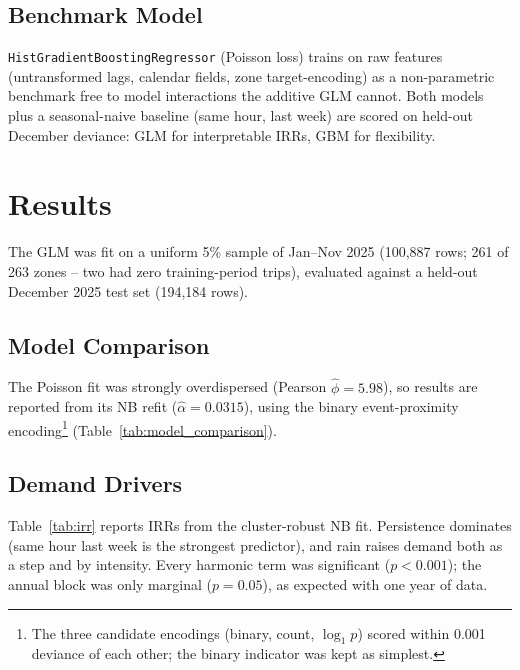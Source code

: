 \documentclass[11pt]{article}
\begin{document}
\subsection{Benchmark Model}

\texttt{HistGradientBoostingRegressor} (Poisson loss) trains on raw features (untransformed lags, calendar fields, zone target-encoding) as a non-parametric benchmark free to model interactions the additive GLM cannot. Both models plus a seasonal-naive baseline (same hour, last week) are scored on held-out December deviance: GLM for interpretable IRRs, GBM for flexibility.

\FloatBarrier
\section{Results}
\label{sec:results}

The GLM was fit on a uniform 5\% sample of Jan--Nov 2025 (100,887 rows; 261 of 263 zones -- two had zero training-period trips), evaluated against a held-out December 2025 test set (194,184 rows).

\subsection{Model Comparison}

The Poisson fit was strongly overdispersed (Pearson $\hat\phi = 5.98$), so results are reported from its NB refit ($\hat\alpha = 0.0315$), using the binary event-proximity encoding\footnote{The three candidate encodings (binary, count, $\log_1p$) scored within 0.001 deviance of each other; the binary indicator was kept as simplest.} (Table~\ref{tab:model_comparison}).

\subsection{Demand Drivers}

Table~\ref{tab:irr} reports IRRs from the cluster-robust NB fit. Persistence dominates (same hour last week is the strongest predictor), and rain raises demand both as a step and by intensity. Every harmonic term was significant ($p<0.001$); the annual block was only marginal ($p=0.05$), as expected with one year of data.
\end{document}
